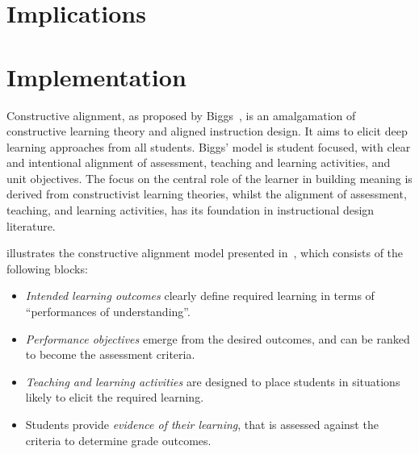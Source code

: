 


\section{Implications} %
\label{sec:implications}


\section{Implementation} %
\label{sec:design}

Constructive alignment, as proposed by Biggs~\cite{Biggs:1996c}, is an amalgamation of constructive learning theory and aligned instruction design. It aims to elicit deep learning approaches from all students. Biggs' model is student focused, with clear and intentional alignment of assessment, teaching and learning activities, and unit objectives. The focus on the central role of the learner in building meaning is derived from constructivist learning theories, whilst the alignment of assessment, teaching, and learning activities, has its foundation in instructional design literature. 

 illustrates the constructive alignment model presented in~\cite{Houghton:2004}, which consists of the following blocks:

\begin{itemize}
	\item \emph{Intended learning outcomes} clearly define required learning in terms of ``performances of understanding''.
	\item \emph{Performance objectives} emerge from the desired outcomes, and can be ranked to become the assessment criteria.
	\item \emph{Teaching and learning activities} are designed to place students in situations likely to elicit the required learning.
	\item Students provide \emph{evidence of their learning}, that is assessed against the criteria to determine grade outcomes.
\end{itemize}


